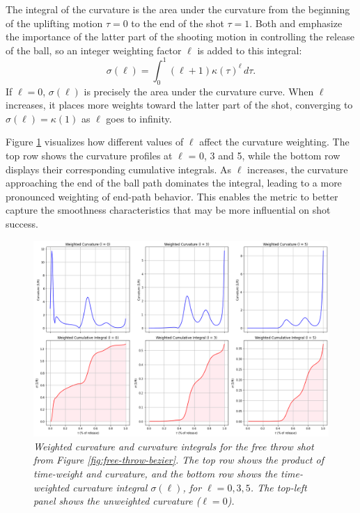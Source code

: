 \documentclass{article}
\begin{document}
          The integral of the curvature is the area under the curvature from the beginning of the uplifting motion \(\tau = 0\) to the end of the shot \(\tau = 1\). Both \citet{button_examining_2003} and \citet{slegers_role_2024} emphasize the importance of the latter part of the shooting motion in controlling the release of the ball, so an integer weighting factor $\ell$ is added to this integral:
          \[
            \sigma(\ell) = \int_{0}^{1} (\ell + 1) \kappa(\tau)^\ell \, d\tau.
          \]
          If \(\ell = 0\), \(\sigma(\ell)\) is precisely the area under the curvature curve. When $\ell$ increases, it places more weights toward the latter part of the shot, converging to \(\sigma(\ell) = \kappa(1)\) as $\ell$ goes to infinity. 
    
          Figure \ref{fig:weights} visualizes how different values of $\ell$ affect the curvature weighting. The top row shows the curvature profiles at $\ell$ = 0, 3 and 5, while the bottom row displays their corresponding cumulative integrals. As $\ell$ increases, the curvature approaching the end of the ball path dominates the integral, leading to a more pronounced weighting of end-path behavior. This enables the metric to better capture the smoothness characteristics that may be more influential on shot success.

          \begin{figure}[H]
              \centering
              \includegraphics[width=0.8\linewidth]{reports/arxiv/weights.png}
              \caption{\it Weighted curvature and curvature integrals for the free throw shot from Figure \ref{fig:free-throw-bezier}. The top row shows the product of time-weight and curvature, and the bottom row shows the time-weighted curvature integral \(\sigma(\ell)\), for \(\ell = 0, 3, 5\). The top-left panel shows the unweighted curvature (\(\ell = 0\)).}
              \label{fig:weights}
          \end{figure}
\end{document}
